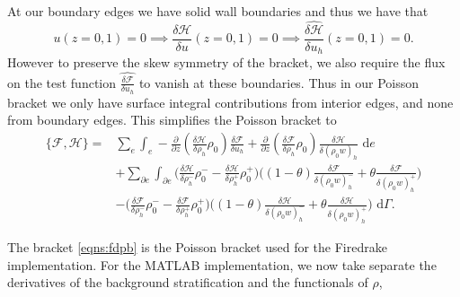 \documentclass[a4paper,11pt]{article}
\begin{document}
 At our boundary edges we have solid wall boundaries and thus we have that 
\[ u(z = 0, 1) = 0 \implies   \frac{\delta  \mathcal{H}}{\delta u}(z=0,1) = 0 \implies   \widehat{\frac{\delta  \mathcal{H}}{\delta u_h}}(z=0,1) = 0.\]
However to preserve the skew symmetry of the bracket, we also require the flux on the test function $  \widehat{\frac{\delta  \mathcal{F}}{\delta u_h}}$ to vanish at these boundaries. Thus in our Poisson bracket we only have surface integral contributions from interior edges, and none from boundary edges.
 This simplifies the Poisson bracket to 
 \begin{equation}\label{eqns:fdpb}
\begin{aligned}
 \{ \mathcal{F},  \mathcal{H}\} = &  \sum_e \int_e - \frac{\partial}{\partial z}(\frac{\delta  \mathcal{H}}{\delta \rho_h}\rho_0 ) \frac{\delta  \mathcal{F}}{\delta u_h} + \frac{\partial}{\partial z}(\frac{\delta  \mathcal{F}}{\delta \rho_h}\rho_0)\frac{\delta  \mathcal{H}}{\delta (\rho_0 w)_h} \text{ d}e \\
 &+ \sum_{\partial e}\int_{\partial e } \bigg(  \frac{\delta  \mathcal{H}}{\delta \rho_h^-}\rho_0^- -\frac{\delta  \mathcal{H}}{\delta \rho_h^+}\rho_0^+\bigg)\bigg ( (1-\theta) \frac{\delta  \mathcal{F}}{\delta  (\rho_0 w)_h^-}+ \theta\frac{\delta  \mathcal{F}}{\delta  (\rho_0 w)_h^+} \bigg)\\
 & - \bigg(  \frac{\delta  \mathcal{F}}{\delta \rho_h^-}\rho_0^- -\frac{\delta  \mathcal{F}}{\delta \rho_h^+}\rho_0^+\bigg)\bigg ( (1-\theta) \frac{\delta  \mathcal{H}}{\delta  (\rho_0 w)_h^-}+ \theta\frac{\delta  \mathcal{H}}{\delta  (\rho_0 w)_h^+} \bigg) \text{ d} \Gamma.
 \end{aligned}
 \end{equation}

The bracket \eqref{eqns:fdpb} is the Poisson bracket used for the Firedrake implementation. For the MATLAB implementation, we now take separate the derivatives of the background stratification and the functionals of $\rho$,
\end{document}

